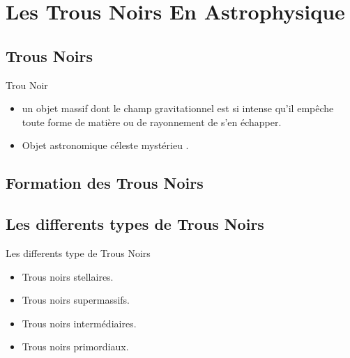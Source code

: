 \documentclass{beamer}
\begin{document}
\begin{frame}
\tableofcontents[pausesections]
\end{frame}


\section{Les Trous Noirs En Astrophysique}
\subsection{Trous Noirs}

\begin{frame}
\begin{block}{Trou Noir }
	\begin{itemize}
	 	\item   un objet massif dont le champ gravitationnel est si
		intense qu’il empêche toute forme de matière ou de rayonnement de s'en échapper.
		\item    Objet astronomique céleste mystérieu .
	\end{itemize}
\end{block}

\end{frame}


\subsection{Formation des Trous Noirs}

\begin{frame}

\end{frame}

\subsection{Les differents types de Trous Noirs}

\begin{frame}

{Les differents type de Trous Noirs}


	\begin{itemize}
		\item Trous noirs stellaires.
		\item Trous noirs supermassifs.
		\item Trous noirs intermédiaires.
		\item Trous noirs primordiaux. 
	\end{itemize} 
\end{frame}
\end{document}
